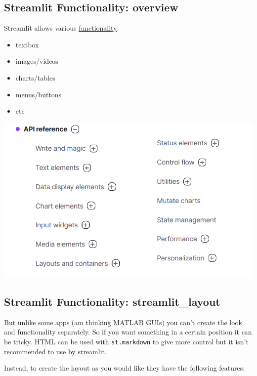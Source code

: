 \documentclass[
  letterpaper,
  DIV=11,
  numbers=noendperiod]{scrartcl}
\providecommand{\tightlist}{%
  \setlength{\itemsep}{0pt}\setlength{\parskip}{0pt}}\usepackage{longtable,booktabs,array}
\begin{document}
\hypertarget{streamlit-functionality-overview}{%
\subsection{Streamlit Functionality:
overview}\label{streamlit-functionality-overview}}

Streamlit allows various
\href{https://docs.streamlit.io/library/api-reference}{functionality}:

\begin{itemize}
\tightlist
\item
  textbox
\item
  images/videos
\item
  charts/tables
\item
  menus/buttons
\item
  etc
\end{itemize}

\includegraphics{ghtop_images/streamlit_API.png}

\hypertarget{streamlit-functionality-streamlit_layout}{%
\subsection{Streamlit Functionality:
streamlit\_layout}\label{streamlit-functionality-streamlit_layout}}

But unlike some apps (am thinking MATLAB GUIs) you can't create the look
and functionality separately. So if you want something in a certain
position it can be tricky. HTML can be used with \texttt{st.markdown} to
give more control but it isn't recommended to use by streamlit.

Instead, to create the layout as you would like they have the following
features:
\end{document}
